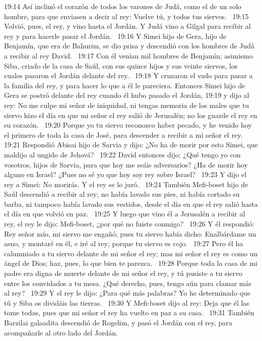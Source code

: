 19:14 Así inclinó el corazón de todos los varones de Judá, como el de un solo hombre, para que enviasen a decir al rey: Vuelve tú, y todos tus siervos.  
19:15 Volvió, pues, el rey, y vino hasta el Jordán. Y Judá vino a Gilgal para recibir al rey y para hacerle pasar el Jordán.  
19:16 Y Simei hijo de Gera, hijo de Benjamín, que era de Bahurim, se dio prisa y descendió con los hombres de Judá a recibir al rey David.  
19:17 Con él venían mil hombres de Benjamín; asimismo Siba, criado de la casa de Saúl, con sus quince hijos y sus veinte siervos, los cuales pasaron el Jordán delante del rey.  
19:18 Y cruzaron el vado para pasar a la familia del rey, y para hacer lo que a él le pareciera. Entonces Simei hijo de Gera se postró delante del rey cuando él hubo pasado el Jordán, 
19:19 y dijo al rey: No me culpe mi señor de iniquidad, ni tengas memoria de los males que tu siervo hizo el día en que mi señor el rey salió de Jerusalén; no los guarde el rey en su corazón.  
19:20 Porque yo tu siervo reconozco haber pecado, y he venido hoy el primero de toda la casa de José, para descender a recibir a mi señor el rey.  
19:21 Respondió Abisai hijo de Sarvia y dijo: ¿No ha de morir por esto Simei, que maldijo al ungido de Jehová?  
19:22 David entonces dijo: ¿Qué tengo yo con vosotros, hijos de Sarvia, para que hoy me seáis adversarios? ¿Ha de morir hoy alguno en Israel? ¿Pues no sé yo que hoy soy rey sobre Israel?  
19:23 Y dijo el rey a Simei: No morirás. Y el rey se lo juró.  
19:24 También Mefi-boset hijo de Saúl descendió a recibir al rey; no había lavado sus pies, ni había cortado su barba, ni tampoco había lavado sus vestidos, desde el día en que el rey salió hasta el día en que volvió en paz.  
19:25 Y luego que vino él a Jerusalén a recibir al rey, el rey le dijo: Mefi-boset, ¿por qué no fuiste conmigo?  
19:26 Y él respondió: Rey señor mío, mi siervo me engañó; pues tu siervo había dicho: Enalbárdame un asno, y montaré en él, e iré al rey; porque tu siervo es cojo.  
19:27 Pero él ha calumniado a tu siervo delante de mi señor el rey; mas mi señor el rey es como un ángel de Dios; haz, pues, lo que bien te parezca.  
19:28 Porque toda la casa de mi padre era digna de muerte delante de mi señor el rey, y tú pusiste a tu siervo entre los convidados a tu mesa. ¿Qué derecho, pues, tengo aún para clamar más al rey?  
19:29 Y el rey le dijo: ¿Para qué más palabras? Yo he determinado que tú y Siba os dividáis las tierras.  
19:30 Y Mefi-boset dijo al rey: Deja que él las tome todas, pues que mi señor el rey ha vuelto en paz a su casa.  
19:31 También Barzilai galaadita descendió de Rogelim, y pasó el Jordán con el rey, para acompañarle al otro lado del Jordán.  
